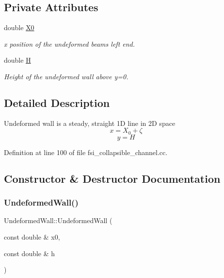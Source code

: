 \subsection*{Private Attributes}
\begin{DoxyCompactItemize}
\item 
double \hyperlink{classUndeformedWall_a7ab875c46fef905df33eb47e0336581b}{X0}
\begin{DoxyCompactList}\small\item\em x position of the undeformed beam\textquotesingle{}s left end. \end{DoxyCompactList}\item 
double \hyperlink{classUndeformedWall_a4525dbe0b5d2108ee51f16bee9af88ef}{H}
\begin{DoxyCompactList}\small\item\em Height of the undeformed wall above y=0. \end{DoxyCompactList}\end{DoxyCompactItemize}


\subsection{Detailed Description}
Undeformed wall is a steady, straight 1D line in 2D space \[ x = X_0 + \zeta \] \[ y = H \] 

Definition at line 100 of file fsi\+\_\+collapsible\+\_\+channel.\+cc.



\subsection{Constructor \& Destructor Documentation}
\mbox{\label{classUndeformedWall_ad09cfdcd234be0ab47eb97a8a470602a}} 
\subsubsection{\texorpdfstring{Undeformed\+Wall()}{UndeformedWall()}\hspace{0.1cm}{\footnotesize\ttfamily [1/4]}}
{\footnotesize\ttfamily Undeformed\+Wall\+::\+Undeformed\+Wall (\begin{DoxyParamCaption}\item[{const double \&}]{x0,  }\item[{const double \&}]{h }\end{DoxyParamCaption})\hspace{0.3cm}{\ttfamily [inline]}}



